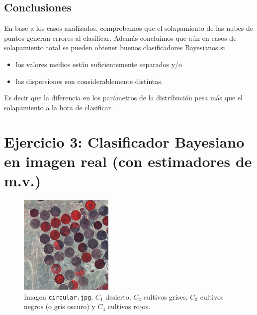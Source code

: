 \documentclass[a4paper,11pt]{article}
\begin{document}
\subsection{Conclusiones}

En base a los casos analizados, comprobamos que el solapamiento de las nubes de puntos generan errores al clasificar. Además concluímos que aún en casos de solapamiento total se pueden obtener buenos clasificadores Bayesianos si
\begin{itemize}
  \item los valores medios están suficientemente separados y/o
  \item las dispersiones son considerablemente distintas.
\end{itemize}
Es decir que la diferencia en los parámetros de la distribución pesa más que el solapamiento a la hora de clasificar.


\section{Ejercicio 3: Clasificador Bayesiano en imagen real (con estimadores de m.v.)}

\begin{figure}[h!]
\centering
\includegraphics[width=0.4\textwidth]{img/circular.jpg}
\caption{Imagen {\tt circular.jpg}. $C_1$ desierto, $C_2$ cultivos grises, $C_3$ cultivos negros (o gris oscuro) y $C_4$ cultivos rojos.}
\label{circular}
\end{figure}
\end{document}
